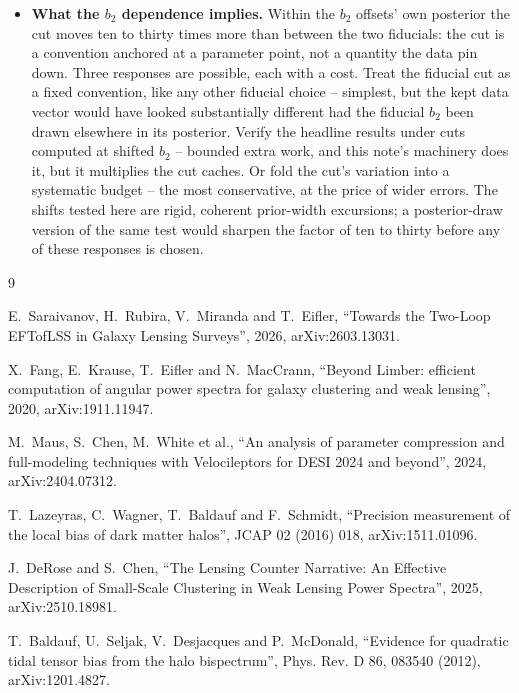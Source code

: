 \documentclass[11pt]{article}
\begin{document}
\begin{itemize}
  \item \textbf{What the $b_2$ dependence implies.}  Within the
    $b_2$ offsets' own posterior the cut moves ten to thirty times
    more than between the two fiducials: the cut is a convention
    anchored at a parameter point, not a quantity the data pin
    down.  Three responses are possible, each with a cost.  Treat
    the fiducial cut as a fixed convention, like any other fiducial
    choice -- simplest, but the kept data vector would have looked
    substantially different had the fiducial $b_2$ been drawn
    elsewhere in its posterior.  Verify the headline results under
    cuts computed at shifted $b_2$ -- bounded extra work, and this
    note's machinery does it, but it multiplies the cut caches.  Or
    fold the cut's variation into a systematic budget -- the most
    conservative, at the price of wider errors.  The shifts tested
    here are rigid, coherent prior-width excursions; a
    posterior-draw version of the same test would sharpen the
    factor of ten to thirty before any of these responses is
    chosen.
\end{itemize}

\begin{thebibliography}{9}

E.~Saraivanov, H.~Rubira, V.~Miranda and T.~Eifler,
``Towards the Two-Loop EFTofLSS in Galaxy Lensing Surveys'',
2026, arXiv:2603.13031.

X.~Fang, E.~Krause, T.~Eifler and N.~MacCrann,
``Beyond Limber: efficient computation of angular power spectra for
galaxy clustering and weak lensing'',
2020, arXiv:1911.11947.

M.~Maus, S.~Chen, M.~White et al.,
``An analysis of parameter compression and full-modeling techniques
with Velocileptors for DESI 2024 and beyond'',
2024, arXiv:2404.07312.

T.~Lazeyras, C.~Wagner, T.~Baldauf and F.~Schmidt,
``Precision measurement of the local bias of dark matter halos'',
JCAP 02 (2016) 018, arXiv:1511.01096.

J.~DeRose and S.~Chen,
``The Lensing Counter Narrative: An Effective Description of
Small-Scale Clustering in Weak Lensing Power Spectra'',
2025, arXiv:2510.18981.

T.~Baldauf, U.~Seljak, V.~Desjacques and P.~McDonald,
``Evidence for quadratic tidal tensor bias from the halo
bispectrum'',
Phys. Rev. D 86, 083540 (2012), arXiv:1201.4827.

\end{thebibliography}
\end{document}
